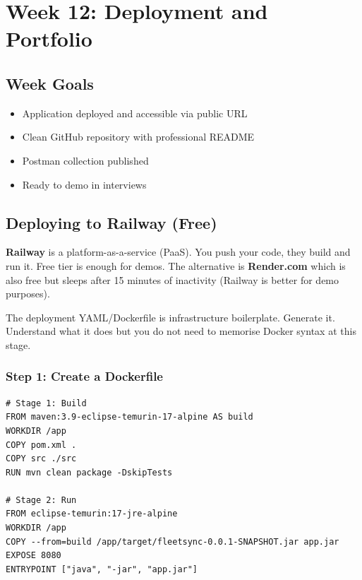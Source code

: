 \documentclass[12pt,a4paper]{report}
\begin{document}
\chapter{Week 12: Deployment and Portfolio}

\section{Week Goals}

\begin{itemize}
  \item Application deployed and accessible via public URL
  \item Clean GitHub repository with professional README
  \item Postman collection published
  \item Ready to demo in interviews
\end{itemize}

\section{Deploying to Railway (Free)}

\begin{tcolorbox}[notebox]
\textbf{Railway} is a platform-as-a-service (PaaS). You push your code, they build and run it. Free tier is enough for demos. The alternative is \textbf{Render.com} which is also free but sleeps after 15 minutes of inactivity (Railway is better for demo purposes).
\end{tcolorbox}

\begin{tcolorbox}[aibox]
The deployment YAML/Dockerfile is infrastructure boilerplate. Generate it. Understand what it does but you do not need to memorise Docker syntax at this stage.
\end{tcolorbox}

\subsection{Step 1: Create a Dockerfile}

\begin{lstlisting}[style=bashstyle,caption=Dockerfile in project root]
# Stage 1: Build
FROM maven:3.9-eclipse-temurin-17-alpine AS build
WORKDIR /app
COPY pom.xml .
COPY src ./src
RUN mvn clean package -DskipTests

# Stage 2: Run
FROM eclipse-temurin:17-jre-alpine
WORKDIR /app
COPY --from=build /app/target/fleetsync-0.0.1-SNAPSHOT.jar app.jar
EXPOSE 8080
ENTRYPOINT ["java", "-jar", "app.jar"]
\end{lstlisting}
\end{document}

